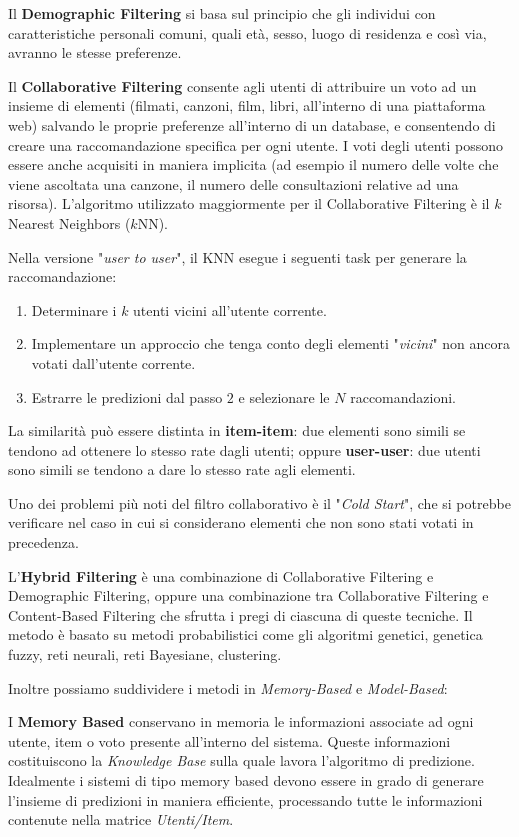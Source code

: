 \documentclass[12pt]{article}
\begin{document}
Il \textbf{Demographic Filtering} si basa sul principio che gli individui con caratteristiche personali comuni, quali età, sesso, luogo di residenza e così via, avranno le stesse preferenze.

Il \textbf{Collaborative Filtering} consente agli utenti di attribuire un voto ad un insieme di elementi (filmati, canzoni, film, libri, all'interno di una piattaforma web) salvando le proprie preferenze all'interno di un database, e consentendo di creare una raccomandazione specifica per ogni utente. I voti degli utenti possono essere anche acquisiti in maniera implicita (ad esempio il numero delle volte che viene ascoltata una canzone, il numero delle consultazioni relative ad una risorsa). L'algoritmo utilizzato maggiormente per il Collaborative Filtering è il $k$ Nearest Neighbors ($k$NN). 

Nella versione "\textit{user to user}", il KNN esegue i seguenti task per generare la raccomandazione:
\begin{enumerate}
\item Determinare i $k$ utenti vicini all'utente corrente.
\item Implementare un approccio che tenga conto degli elementi "\textit{vicini}" non ancora votati dall'utente corrente.
\item Estrarre le predizioni dal passo $2$ e selezionare le $N$ raccomandazioni.
\end{enumerate}

La similarità può essere distinta in \textbf{item-item}: due elementi sono simili se tendono ad ottenere lo stesso rate dagli utenti; oppure \textbf{user-user}: due utenti sono simili se tendono a dare lo stesso rate agli elementi.

Uno dei problemi più noti del filtro collaborativo è il "\textit{Cold Start}", che si potrebbe verificare nel caso in cui si considerano elementi che non sono stati votati in precedenza.

L'\textbf{Hybrid Filtering} è una combinazione di Collaborative Filtering e Demographic Filtering, oppure una combinazione tra Collaborative Filtering e Content-Based Filtering che sfrutta i pregi di ciascuna di queste tecniche. Il metodo è basato su metodi probabilistici come gli algoritmi genetici, genetica fuzzy, reti neurali, reti Bayesiane, clustering.

Inoltre possiamo suddividere i metodi in \textit{Memory-Based} e \textit{Model-Based}:

I \textbf{Memory Based} conservano in memoria le informazioni associate ad ogni utente, item o voto presente all'interno del sistema. Queste informazioni costituiscono la \textit{Knowledge Base} sulla quale lavora l'algoritmo di predizione. Idealmente i sistemi di tipo memory based devono essere in grado di generare l'insieme di predizioni in maniera efficiente, processando tutte le informazioni contenute nella matrice
\textit{Utenti/Item}.
\end{document}

